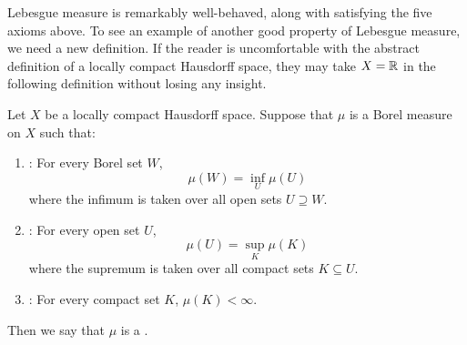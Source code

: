 \begin{subsec}
Lebesgue measure is remarkably well-behaved, along with satisfying the five axioms above.
To see an example of another good property of Lebesgue measure, we need a new definition.
If the reader is uncomfortable with the abstract definition of a locally compact Hausdorff space, they may take $X = \mathbb{R}$ in the following definition without losing any insight.
\end{subsec}

\begin{definition}
\label{dfn of radon measure}
Let $X$ be a locally compact Hausdorff space.
Suppose that $\mu$ is a Borel measure on $X$ such that:
\begin{enumerate}
\item {}: For every Borel set $W$,
\[\mu(W) = \inf_{U} \mu(U)\]
where the infimum is taken over all open sets $U \supseteq W$.
\item {}: For every open set $U$,
\[\mu(U) = \sup_{K} \mu(K)\]
where the supremum is taken over all compact sets $K \subseteq U$.
\item {}: For every compact set $K$, $\mu(K) < \infty$.
\end{enumerate}
Then we say that $\mu$ is a .
\end{definition}

